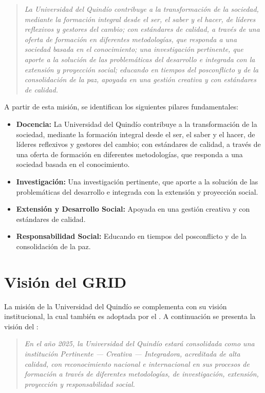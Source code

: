 \begin{quote}
\textit{La Universidad del Quindío contribuye a la transformación de la sociedad, mediante la formación integral desde el ser, el saber y el hacer, de líderes reflexivos y gestores del cambio; con estándares de calidad, a través de una oferta de formación en diferentes metodologías, que responda a una sociedad basada en el conocimiento; una investigación pertinente, que aporte a la solución de las problemáticas del desarrollo e integrada con la extensión y proyección social; educando en tiempos del posconflicto y de la consolidación de la paz, apoyada en una gestión creativa y con estándares de calidad.}
\end{quote}

A partir de esta misión, se identifican los siguientes pilares fundamentales:

\begin{itemize}
    \item \textbf{Docencia:} La Universidad del Quindío contribuye a la transformación de la sociedad, mediante la formación integral desde el ser, el saber y el hacer, de líderes reflexivos y gestores del cambio; con estándares de calidad, a través de una oferta de formación en diferentes metodologías, que responda a una sociedad basada en el conocimiento.

    \item \textbf{Investigación:} Una investigación pertinente, que aporte a la solución de las problemáticas del desarrollo e integrada con la extensión y proyección social.

    \item \textbf{Extensión y Desarrollo Social:} Apoyada en una gestión creativa y con estándares de calidad.

    \item \textbf{Responsabilidad Social:} Educando en tiempos del posconflicto y de la consolidación de la paz.
\end{itemize}

\section{Visión del GRID}
La misión de la Universidad del Quindío se complementa con su visión institucional, la cual también es adoptada por el \GRID. A continuación se presenta la visión del \GRID:\@

\begin{quote}
\textit{En el año 2025, la Universidad del Quindío estará consolidada como una institución \textit{Pertinente --- Creativa --- Integradora}, acreditada de alta calidad, con reconocimiento nacional e internacional en sus procesos de formación a través de diferentes metodologías, de investigación, extensión, proyección y responsabilidad social.}
\end{quote}

